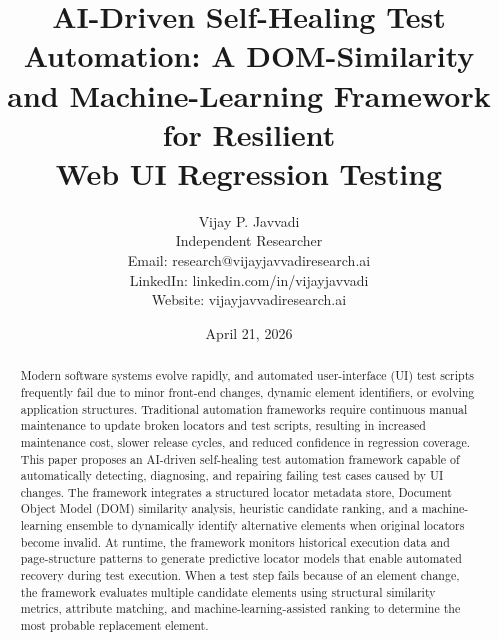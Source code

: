 \documentclass[12pt]{article}
\title{AI-Driven Self-Healing Test Automation: A DOM-Similarity\\and Machine-Learning Framework for Resilient\\Web UI Regression Testing}
\author{
Vijay P. Javvadi\\
Independent Researcher\\
Email: research@vijayjavvadiresearch.ai\\
LinkedIn: linkedin.com/in/vijayjavvadi\\
Website: vijayjavvadiresearch.ai
}
\date{April 21, 2026}
\begin{document}
\maketitle

\begin{abstract}
Modern software systems evolve rapidly, and automated user-interface (UI) test scripts frequently fail due to minor front-end changes, dynamic element identifiers, or evolving application structures. Traditional automation frameworks require continuous manual maintenance to update broken locators and test scripts, resulting in increased maintenance cost, slower release cycles, and reduced confidence in regression coverage. This paper proposes an AI-driven self-healing test automation framework capable of automatically detecting, diagnosing, and repairing failing test cases caused by UI changes. The framework integrates a structured locator metadata store, Document Object Model (DOM) similarity analysis, heuristic candidate ranking, and a machine-learning ensemble to dynamically identify alternative elements when original locators become invalid. At runtime, the framework monitors historical execution data and page-structure patterns to generate predictive locator models that enable automated recovery during test execution. When a test step fails because of an element change, the framework evaluates multiple candidate elements using structural similarity metrics, attribute matching, and machine-learning-assisted ranking to determine the most probable replacement element.


\end{abstract}
\end{document}
